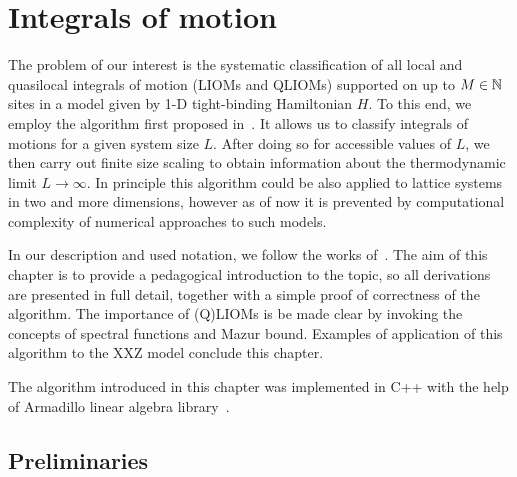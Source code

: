 \chapter{Integrals of motion\label{chap:iom}}
\thispagestyle{chapterBeginStyle}

The problem of our interest is the systematic classification of all local and quasilocal integrals of
motion (LIOMs and QLIOMs) supported on up to \( M \in \mathbb{N} \) sites in a model given by 1-D tight-binding Hamiltonian \(H\). 
To this end, we employ the algorithm first proposed in~\textcite{Mierzejewski2015a}. It allows us to classify integrals
of motions for a given system size \(L\). After doing so for accessible values of \(L\), we then carry out finite size scaling
to obtain information about the thermodynamic limit \(L \to \infty \). In principle this algorithm could
be also applied to lattice systems in two and more dimensions, however as of now it is prevented by computational
complexity of numerical approaches to such models.

In our description and used notation, we follow
the works of~\textcite{Mierzejewski2015a,Mierzejewski2015Approx,Mierzejewski2018}.
The aim of this chapter is to provide a pedagogical introduction to the topic,
so all derivations are presented in full detail, together with a simple proof of correctness of the algorithm.
The importance of (Q)LIOMs is be made clear by invoking the concepts of spectral functions and Mazur bound.
Examples of application of this algorithm to the XXZ model conclude this chapter.

The algorithm introduced in this chapter was implemented in C++ with the help of Armadillo
linear algebra library~\autocite{Sanderson2016,Sanderson2018}.

\section{Preliminaries\label{sec:prelim}}
